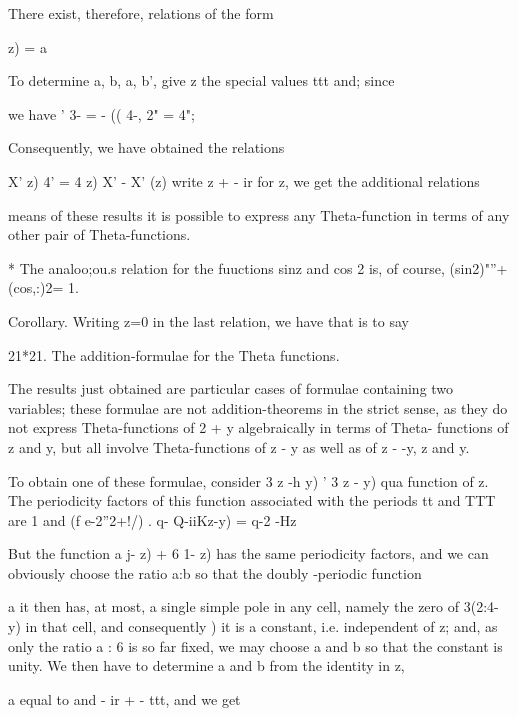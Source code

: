 There exist, therefore, relations of the form

     z) = a%

To determine a, b, a, b', give z the special values ttt and; since

we have ' 3- = - (( 4-, 2" = 4"; %

Consequently, we have obtained the relations

X' z) 4' = 4 z) X' - X' (z) %
write z + - ir for z, we get the additional relations

means of these results it is possible to express any Theta-function in
terms of any other pair of Theta-functions.

* The analoo;ou.s relation for the fuuctions sinz and cos 2 is, of
course, (sin2)"''+(cos,:)2= 1.

%
%

Corollary. Writing z=0 in the last relation, we have that is to say

21*21. The addition-formulae for the Theta functions.

The results just obtained are particular cases of formulae containing
two variables; these formulae are not addition-theorems in the strict
sense, as they do not express Theta-functions of 2 + y algebraically
in terms of Theta- functions of z and y, but all involve
Theta-functions of z - y as well as of z - -y, z and y.

To obtain one of these formulae, consider 3 z -h y) ' 3 z - y) qua
function of z. The periodicity factors of this function associated
with the periods tt and TTT are 1 and (f e-2''2+!/) . q- Q-iiKz-y) =
q-2 -Hz

But the function a j- z) + 6 1- z) has the same periodicity factors,
and we can obviously choose the ratio a:b so that the doubly -periodic
function

a%
it then has, at most, a single simple pole in any cell, namely the
zero of 3(2:4- y) in that cell, and consequently ) it is a
constant, i.e. independent of z; and, as only the ratio a : 6 is so
far fixed, we may choose a and b so that the constant is unity. We
then have to determine a and b from the identity in z,

a%
equal to and - ir + - ttt, and we get

